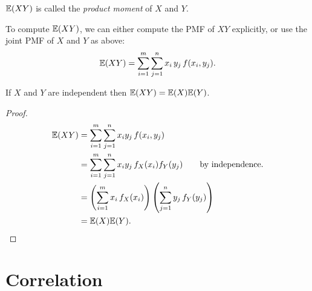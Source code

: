\begin{definition}
$\mathbb{E}(XY)$ is called the \emph{product moment} of $X$ and $Y$.
\end{definition}

To compute $\mathbb{E}(XY)$, we can either compute the PMF of $XY$ explicitly, or use the joint PMF of $X$ and $Y$ as above:
\[
\mathbb{E}(XY) = \sum_{i=1}^m\sum_{j=1}^n x_i\,y_j\,f(x_i,y_j).
\]

%
\begin{lemma}\label{lem:independent_implies_uncorrelated}
If $X$ and $Y$ are independent then $\mathbb{E}(XY)=\mathbb{E}(X)\mathbb{E}(Y)$.
\end{lemma}

\begin{proof}
%
\begin{align*}
\mathbb{E}(XY) 
	& = \sum_{i=1}^m\sum_{j=1}^n x_i y_j \, f(x_i,y_j) \\
	& = \sum_{i=1}^m\sum_{j=1}^n x_i y_j \, f_X(x_i)f_Y(y_j) \qquad\text{by independence.}\\
	& = \left(\sum_{i=1}^m x_i \, f_X(x_i)\right)\left(\sum_{j=1}^n y_j \, f_Y(y_j)\right) \\
	& = \mathbb{E}(X)\mathbb{E}(Y).
\end{align*}
\end{proof}

\section{Correlation}

